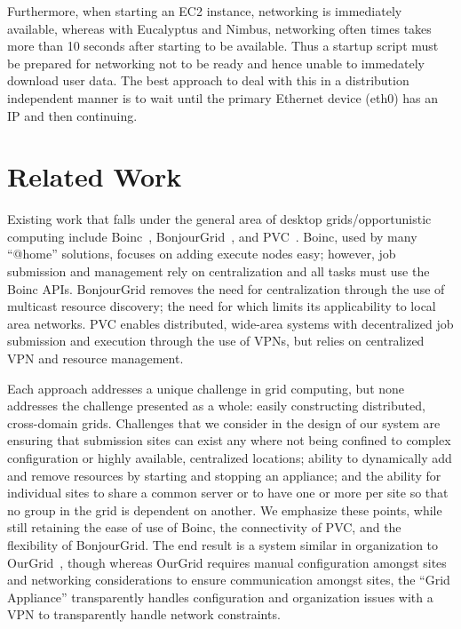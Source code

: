 \documentclass[conference]{IEEEtran}
\begin{document}
Furthermore, when starting an EC2 instance, networking is immediately
available, whereas with Eucalyptus and Nimbus, networking often times takes
more than 10 seconds after starting to be available. Thus a startup script must
be prepared for networking not to be ready and hence unable to immedately
download user data.  The best approach to deal with this in a distribution
independent manner is to wait until the primary Ethernet device (eth0) has an
IP and then continuing.

\section{Related Work}
\label{related_work}

Existing work that falls under the general area of desktop grids/opportunistic
computing include Boinc~\cite{boinc}, BonjourGrid~\cite{bonjourgrid}, and
PVC~\cite{pvc}.  Boinc, used by many ``@home'' solutions, focuses on adding
execute nodes easy; however, job submission and management rely on
centralization and all tasks must use the Boinc APIs.  BonjourGrid removes the
need for centralization through the use of multicast resource discovery; the
need for which limits its applicability to local area networks.  PVC enables
distributed, wide-area systems with decentralized job submission and execution
through the use of VPNs, but relies on centralized VPN and resource management.

Each approach addresses a unique challenge in grid computing, but none
addresses the challenge presented as a whole: easily constructing distributed,
cross-domain grids.  Challenges that we consider in the design of our system
are ensuring that submission sites can exist any where not being confined to
complex configuration or highly available, centralized locations; ability to
dynamically add and remove resources by starting and stopping an appliance; and
the ability for individual sites to share a common server or to have one or
more per site so that no group in the grid is dependent on another.  We
emphasize these points, while still retaining the ease of use of Boinc, the
connectivity of PVC, and the flexibility of BonjourGrid.  The end result is a
system similar in organization to OurGrid~\cite{ourgrid}, though whereas OurGrid
requires manual configuration amongst sites and networking considerations to
ensure communication amongst sites, the ``Grid Appliance'' transparently handles
configuration and organization issues with a VPN to transparently handle network
constraints.
\end{document}
